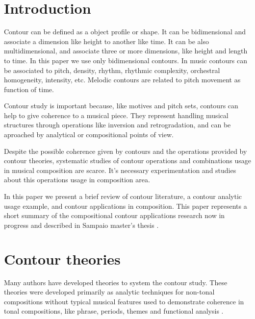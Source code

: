

\section{Introduction}
\label{sec:introduction}

Contour can be defined as a object profile or shape. It can be
bidimensional and associate a dimension like height to another like
time. It can be also multidimensional, and associate three or more
dimensions, like height and length to time. In this paper we use only
bidimensional contours. In music contours can be associated to pitch,
density, rhythm, rhythmic complexity, orchestral homogeneity,
intensity, etc. Melodic contours are related to pitch movement as
function of time.

Contour study is important because, like motives and pitch sets,
contours can help to give coherence to a musical piece. They represent
handling musical structures through operations like inversion and
retrogradation, and can be aproached by analytical or compositional
points of view.

Despite the possible coherence given by contours and the operations
provided by contour theories, systematic studies of contour operations
and combinations usage in musical composition are scarce. It's
necessary experimentation and studies about this operations usage in
composition area.

In this paper we present a brief review of contour literature, a
contour analytic usage example, and contour applications in
composition. This paper represents a short summary of the
compositional contour applications research now in progress and
described in Sampaio master's thesis \cite{sampaio08:em}.

\section{Contour theories}
\label{sec:contour-theories}

Many authors
\cite{friedmann85:methodology,friedmann87:response,morris87:composition,morris93:directions,marvin.ea87:relating,marvin88:generalized,marvin.ea95:generalization,polansky.ea92:possible,quinn97:fuzzy,clifford95:contour,beard03:contour}
have developed theories to system the contour study. These theories
were developed primarily as analytic techniques for non-tonal
compositions without typical musical features used to demonstrate
coherence in tonal compositions, like phrase, periods, themes and
functional analysis \cite{beard03:contour}.

